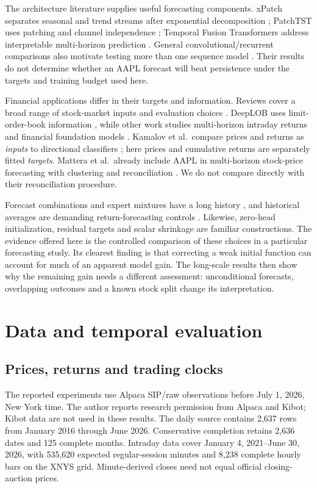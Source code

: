 The architecture literature supplies useful forecasting components. xPatch separates seasonal and trend streams after exponential decomposition \cite{r1}; PatchTST uses patching and channel independence \cite{r2}; Temporal Fusion Transformers address interpretable multi-horizon prediction \cite{r3}. General convolutional/recurrent comparisons also motivate testing more than one sequence model \cite{r13}. Their results do not determine whether an AAPL forecast will beat persistence under the targets and training budget used here.

Financial applications differ in their targets and information. Reviews cover a broad range of stock-market inputs and evaluation choices \cite{r4}. DeepLOB uses limit-order-book information \cite{r5}, while other work studies multi-horizon intraday returns \cite{r6} and financial foundation models \cite{r7}. Kamalov et al.~compare prices and returns as \emph{inputs} to directional classifiers \cite{r8}; here prices and cumulative returns are separately fitted \emph{targets}. Mattera et al.~already include AAPL in multi-horizon stock-price forecasting with clustering and reconciliation \cite{r9}. We do not compare directly with their reconciliation procedure.

Forecast combinations and expert mixtures have a long history \cite{r14,r15}, and historical averages are demanding return-forecasting controls \cite{r16}. Likewise, zero-head initialization, residual targets and scalar shrinkage are familiar constructions. The evidence offered here is the controlled comparison of these choices in a particular forecasting study. Its clearest finding is that correcting a weak initial function can account for much of an apparent model gain. The long-scale results then show why the remaining gain needs a different assessment: unconditional forecasts, overlapping outcomes and a known stock split change its interpretation.

\section{Data and temporal evaluation}\label{sec:data}

\subsection{Prices, returns and trading clocks}

The reported experiments use Alpaca SIP/raw observations before July 1, 2026, New York time. The author reports research permission from Alpaca and Kibot; Kibot data are not used in these results. The daily source contains 2,637 rows from January 2016 through June 2026. Conservative completion retains 2,636 dates and 125 complete months. Intraday data cover January 4, 2021--June 30, 2026, with 535,620 expected regular-session minutes and 8,238 complete hourly bars on the XNYS grid. Minute-derived closes need not equal official closing-auction prices.

